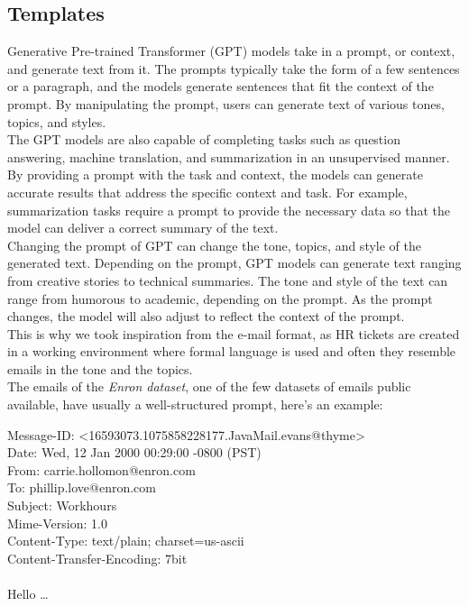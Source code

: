 \subsection*{Templates}
Generative Pre-trained Transformer (GPT) \cite{radford2018improving} models take in a prompt, or context, and generate text from it. The prompts typically take the form of a few sentences or a paragraph, and the models generate sentences that fit the context of the prompt. By manipulating the prompt, users can generate text of various tones, topics, and styles. \\
The GPT models are also capable of completing tasks such as question answering, machine translation, and summarization in an unsupervised manner\cite{radford2019language}. By providing a prompt with the task and context, the models can generate accurate results that address the specific context and task. For example, summarization tasks require a prompt to provide the necessary data so that the model can deliver a correct summary of the text. \\
Changing the prompt of GPT can change the tone, topics, and style of the generated text. Depending on the prompt, GPT models can generate text ranging from creative stories to technical summaries. The tone and style of the text can range from humorous to academic, depending on the prompt. As the prompt changes, the model will also adjust to reflect the context of the prompt. \\
This is why we took inspiration from the e-mail format, as HR tickets are created in a working environment where formal language is used and often they resemble emails in the tone and the topics. \\
The emails of the \textit{Enron dataset}, one of the few datasets of emails public available, have usually a well-structured prompt, here's an example: 
\begin{adjustwidth}{1cm}{}
    Message-ID: <16593073.1075858228177.JavaMail.evans@thyme>\\
    Date: Wed, 12 Jan 2000 00:29:00 -0800 (PST) \\
    From: carrie.hollomon@enron.com\\
    To: phillip.love@enron.com\\
    Subject: Workhours\\
    Mime-Version: 1.0\\
    Content-Type: text/plain; charset=us-ascii\\
    Content-Transfer-Encoding: 7bit\\\\
    Hello \dots
\end{adjustwidth}
